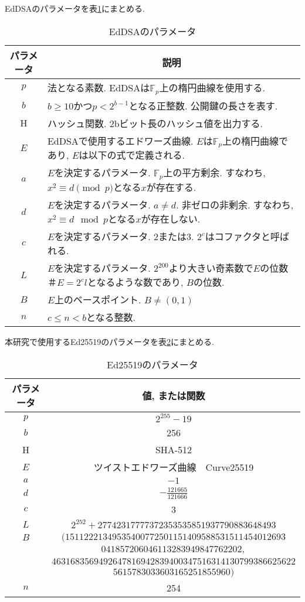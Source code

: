 EdDSAのパラメータを表\ref{tab:eddsa-parameters}にまとめる.\\
\begin{table}[htbp]\label{tab:eddsa-parameters}
  \caption{EdDSAのパラメータ}
  \centering
  \begin{tabular}{cp{10cm}}
    \hline
    \multicolumn{1}{c}{パラメータ} & \multicolumn{1}{c}{説明} \\ \hline \hline
    $p$ & 法となる素数. EdDSAは$\mathbb{F}_p$上の楕円曲線を使用する.\\
    $b$ & $b\geq 10$かつ$p<2^{b-1}$となる正整数. 公開鍵の長さを表す.\\
    H & ハッシュ関数. 2bビット長のハッシュ値を出力する. \\
    $E$ & EdDSAで使用するエドワーズ曲線. $E$は$\mathbb{F}_p$上の楕円曲線であり, $E$は以下の式で定義される.\\
    $a$ & $E$を決定するパラメータ. $\mathbb{F}_p$上の平方剰余. すなわち, $x^2\equiv d \pmod{p}$となる$x$が存在する.\\
    $d$ & $E$を決定するパラメータ. $a\neq d$. 非ゼロの非剰余. すなわち, $x^2\equiv d \mod{p}$となる$x$が存在しない.\\
    $c$ & $E$を決定するパラメータ. $2$または$3$. $2^{c}$はコファクタと呼ばれる.\\
    $L$ & $E$を決定するパラメータ. $2^{200}$より大きい奇素数で$E$の位数$＃E=2^{c}l$となるような数であり, $B$の位数.\\
    $B$ & $E$上のベースポイント. $B\neq (0,1)$\\
    $n$ & $c\leq n < b$となる整数.\\ \hline
  \end{tabular}
\end{table}

本研究で使用するEd25519のパラメータを表\ref{tab:ed25519-parameters}にまとめる.\\
\begin{longtable}{cc}
  \caption{Ed25519のパラメータ}
  \label{tab:ed25519-parameters}
  \endfirsthead
  \hline
  \multicolumn{1}{c}{パラメータ} & \multicolumn{1}{c}{値, または関数} \\ \hline \hline
  $p$ & $2^{255}-19$ \\
  $b$ & 256 \\
  H & SHA-512 \\
  $E$ & ツイストエドワーズ曲線　Curve25519 \\
  $a$ & $-1$ \\
  $d$ & $-\frac{121665}{121666}$ \\
  $c$ & 3 \\
  $L$ & $2^{252} + 27742317777372353535851937790883648493$ \\
  $B$ & $(15112221349535400772501151409588531511454012693$ \\
  & $041857206046113283949847762202,$\\
  & $4631683569492647816942839400347516314130799386625622$ \\
  & $5615783033603165251855960)$ \\
  $n$ & 254 \\ \hline
\end{longtable}

